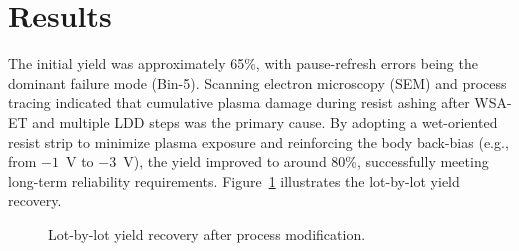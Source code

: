 \section{Results}

The initial yield was approximately 65\%, with pause-refresh errors being the dominant failure mode (Bin-5). 
Scanning electron microscopy (SEM) and process tracing indicated that cumulative plasma damage during resist ashing after WSA-ET and multiple LDD steps was the primary cause. 
By adopting a wet-oriented resist strip to minimize plasma exposure and reinforcing the body back-bias (e.g., from $-1$~V to $-3$~V), the yield improved to around 80\%, successfully meeting long-term reliability requirements. 
Figure~\ref{fig:yield} illustrates the lot-by-lot yield recovery.

\begin{figure}[t]
    \centering
    \fbox{\rule[0pt]{0pt}{2in} \rule[0pt]{3in}{0pt}} 
    \caption{Lot-by-lot yield recovery after process modification.}
    \label{fig:yield}
\end{figure}

